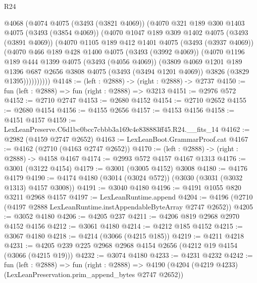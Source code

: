\begin{lexlean}{R24}
\begin{coremodule}
      @4068
        (@4074
          @4075
          (@3493 (@3821 @4069))
          (@4070
            @321
            @189
            @300
            @1403
            @4075
            (@3493 (@3854 @4069))
            (@4070
              @1047
              @189
              @309
              @1402
              @4075
              (@3493 (@3891 @4069))
              (@4070
                @1105
                @189
                @412
                @1401
                @4075
                (@3493 (@3937 @4069))
                (@4070
                  @466
                  @189
                  @428
                  @1400
                  @4075
                  (@3493 (@3992 @4069))
                  (@4070
                    @1196
                    @189
                    @444
                    @1399
                    @4075
                    (@3493 (@4056 @4069))
                    (@3809
                      @4069
                      @1201
                      @189
                      @1396
                      @687
                      @2656
                      @3808
                      @4075
                      (@3493 (@3494 @1201 @4069))
                      @3826
                      (@3829 @1395))))))))))
@4148 := (left : @2888) -> (right : @2888) -> @2737
@4150 := fun (left : @2888) => fun (right : @2888) => @3213
@4151 := @2976 @572
@4152 := @2710 @2747
@4153 := @2680 @4152
@4154 := @2710 @2652
@4155 := @2680 @4154
@4156 := @4155 @2656
@4157 := @4153 @4156
@4158 := @4151 @4157
@4159 := LexLeanPreserve.C6d1bc0bcc7cbbb3a169c4e838883ff45.R24.__fits_14
@4162 := @2982 (@4159 @2747 @2652)
@4163 := LexLeanBoot.GrammarProof.cat
@4167 := @4162 (@2710 (@4163 @2747 @2652))
@4170 := (left : @2888) -> (right : @2888) -> @4158 @4167
@4174 := @2993 @572 @4157 @4167 @1313
@4176 := @3001 (@3122 @4154)
@4179 := @3001 (@3005 @4152) @3008
@4180 := @4176 @4179
@4190 := @4174 @4180 (@3014 (@3024 @572)) (@3030 (@3031 (@3032 @1313) @4157 @3008))
@4191 := @3040 @4180
@4196 := @4191 @1055 @820 @3211 @2968 @4157
@4197 := LexLeanRuntime.append
@4204 := @4196 (@2710 (@4197 @2888 LexLeanRuntime.instAppendableByteArray @2747 @2652))
@4205 := @3052 @4180
@4206 := @4205 @237
@4211 := @4206 @819 @2968 @2970 @4152 @4156
@4212 := @3061 @4180
@4214 := @4212 @185 @4152
@4215 := @3067 @4180
@4218 := @4214 (@3066 (@4215 @185))
@4219 := @4211 @4218
@4231 := @4205 @239 @225 @2968 @2968 @4154 @2656 (@4212 @19 @4154 (@3066 (@4215 @19)))
@4232 := @3074 @4180
@4233 := @4231 @4232
@4242 := fun (left : @2888) =>
  fun (right : @2888) =>
  @4190 (@4204 (@4219 @4233) (LexLeanPreservation.prim_append_bytes @2747 @2652))

\end{coremodule}
\end{lexlean}
